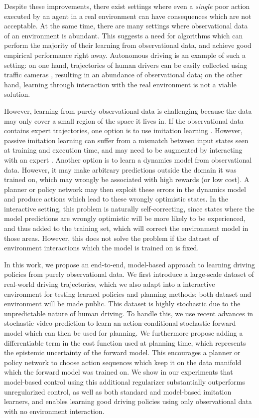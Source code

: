 \documentclass{article} %
\begin{document}
Despite these improvements, there exist settings where even a \textit{single} poor action executed by an agent in a real environment can have consequences which are not acceptable.
At the same time, there are many settings where observational data of an environment is abundant. 
This suggests a need for algorithms which can perform the majority of their learning from observational data, and achieve good empirical performance right away.
Autonomous driving is an example of such a setting: on one hand, trajectories of human drivers can be easily collected using traffic cameras \citep{NGSIM}, resulting in an abundance of observational data; on the other hand, learning through interaction with the real environment is not a viable solution.

However, learning from purely observational data is challenging because the data may only cover a small region of the space it lives in. If the observational data contains expert trajectories, one option is to use imitation learning \citep{Pomerleau91}.
However, passive imitation learning can suffer from a mismatch between input states seen at training and execution time, and may need to be augmented by interacting with an expert \citep{Dagger}.
Another option is to learn a dynamics model from observational data. However, it may make arbitrary predictions outside the domain it was trained on, which may wrongly be associated with high rewards (or low cost). A planner or policy network may then exploit these errors in the dynamics model and produce actions which lead to these wrongly optimistic states.
In the interactive setting, this problem is naturally self-correcting, since states where the model predictions are wrongly optimistic will be more likely to be experienced, and thus added to the training set, which will correct the environment model in those areas. However, this does not solve the problem if the dataset of environment interactions which the model is trained on is fixed.

In this work, we propose an end-to-end, model-based approach to learning driving policies from purely observational data.
We first introduce a large-scale dataset of real-world driving trajectories, which we also adapt into a interactive environment for testing learned policies and planning methods; both dataset and environment will be made public. 
This dataset is highly stochastic due to the unpredictable nature of human driving. 
To handle this, we use recent advances in stochastic video prediction to learn an action-conditional stochastic forward model which can then be used for planning.
We furthermore propose adding a differentiable term in the cost function used at planning time, which represents the epistemic uncertainty of the forward model.
This encourages a planner or policy network to choose action sequences which keep it on the data manifold which the forward model was trained on.
We show in our experiments that model-based control using this additional regularizer substantially outperforms unregularized control, as well as both standard and model-based imitation learners, and enables learning good driving policies using only observational data with no environment interaction.
\end{document}
